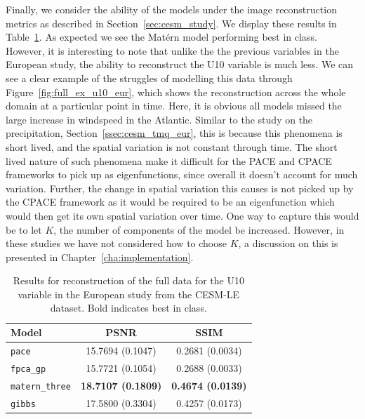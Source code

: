 Finally, we consider the ability of the models under the image reconstruction metrics as described in Section~\ref{sec:cesm_study}.
We display these results in Table~\ref{tab:full_cesm_u10_eur}.
As expected we see the Mat\'ern model performing best in class.
However, it is interesting to note that unlike the the previous variables in the European study, the ability to reconstruct the U10 variable is much less.
We can see a clear example of the struggles of modelling this data through Figure~\ref{fig:full_ex_u10_eur}, which shows the reconstruction across the whole domain at a particular point in time.
Here, it is obvious all models missed the large increase in windspeed in the Atlantic.
Similar to the study on the precipitation, Section~\ref{ssec:cesm_tmq_eur}, this is because this phenomena is short lived, and the spatial variation is not constant through time.
The short lived nature of such phenomena make it difficult for the PACE and CPACE frameworks to pick up as eigenfunctions, since overall it doesn't account for much variation. 
Further, the change in spatial variation this causes is not picked up by the CPACE framework as it would be required to be an eigenfunction which would then get its own spatial variation over time. 
One way to capture this would be to let $K$, the number of components of the model be increased.
However, in these studies we have not considered how to choose $K$, a discussion on this is presented in Chapter~\ref{cha:implementation}.

\begin{table}
	\caption[Results for U10 variable on full data in the European study]{Results for reconstruction of the full data for the U10 variable in the European study from the CESM-LE dataset. Bold indicates best in class.}
	\centering
	\label{tab:full_cesm_u10_eur}
	\begin{tabular}{lcc}
		\toprule
		\textbf{Model} & \textbf{PSNR} & \textbf{SSIM} \\
		\midrule
		\verb*|pace| & 15.7694 (0.1047) & 0.2681 (0.0034) \\
		\verb*|fpca_gp| & 15.7721 (0.1054) & 0.2688	(0.0033)\\
		\verb*|matern_three| & \textbf{18.7107	(0.1809)}& \textbf{0.4674 (0.0139)}\\
		\verb*|gibbs| & 17.5800	(0.3304)& 0.4257 (0.0173)\\
		\bottomrule
	\end{tabular}
\end{table}

